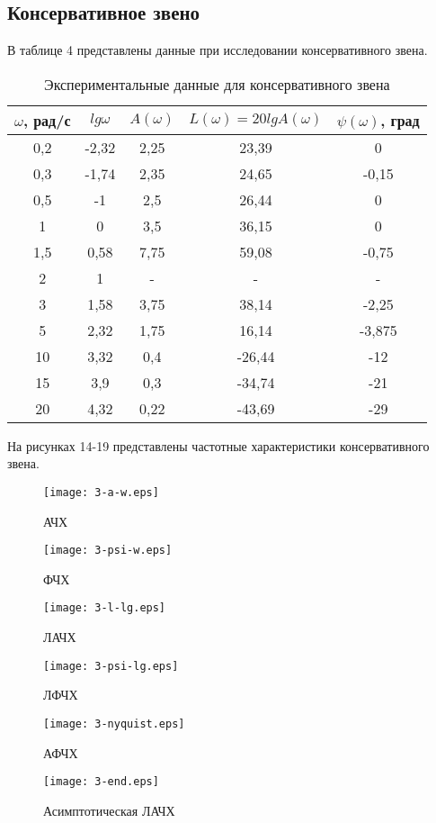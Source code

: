 \documentclass[12pt,a4paper]{article}
\begin{document}
\newpage
\begin{center}
\section{Консервативное звено}
\end{center}

В таблице 4 представлены данные при исследовании консервативного звена.
\begin{table}[h!]
	\renewcommand{\arraystretch}{1.8} %
	\centering
	\begin{threeparttable}
	\caption{Экспериментальные данные для консервативного звена}
	\begin{tabular}{|c|c|c|c|c|}
		\hline $\omega$, рад/с & $lg\omega$ & $A(\omega)$ & $L(\omega)=20lgA(\omega)$ & $\psi(\omega)$, град\\
		\hline 0,2 & -2,32 & 2,25 & 23,39 & 0\\
		\hline 0,3 & -1,74 & 2,35 & 24,65 & -0,15\\
		\hline 0,5 & -1 & 2,5 & 26,44 & 0\\
		\hline 1 & 0 & 3,5 & 36,15 & 0\\
		\hline 1,5 & 0,58 & 7,75 & 59,08 & -0,75\\
		\hline 2 & 1 & - & - & -\\
		\hline 3 & 1,58 & 3,75 & 38,14 & -2,25\\
		\hline 5 & 2,32 & 1,75 & 16,14 & -3,875\\
		\hline 10 & 3,32 & 0,4 & -26,44 & -12\\
		\hline 15 & 3,9 & 0,3 & -34,74 & -21\\
		\hline 20 & 4,32 & 0,22 & -43,69 & -29\\
		\hline
	\end{tabular}
	\end{threeparttable}
\end{table}

На рисунках 14-19 представлены частотные характеристики консервативного звена.
\begin{figure}[H]
	\centering
	\texttt{[image: 3-a-w.eps]}
	\caption{АЧХ}
\end{figure}
\begin{figure}[H]
	\centering
	\texttt{[image: 3-psi-w.eps]}
	\caption{ФЧХ}
\end{figure}
\begin{figure}[H]
	\centering
	\texttt{[image: 3-l-lg.eps]}
	\caption{ЛАЧХ}
\end{figure}
\begin{figure}[H]
	\centering
	\texttt{[image: 3-psi-lg.eps]}
	\caption{ЛФЧХ}
\end{figure}
\begin{figure}[H]
	\centering
	\texttt{[image: 3-nyquist.eps]}
	\caption{АФЧХ}
\end{figure}
\begin{figure}[H]
	\centering
	\texttt{[image: 3-end.eps]}
	\caption{Асимптотическая ЛАЧХ}
\end{figure}
\end{document}
